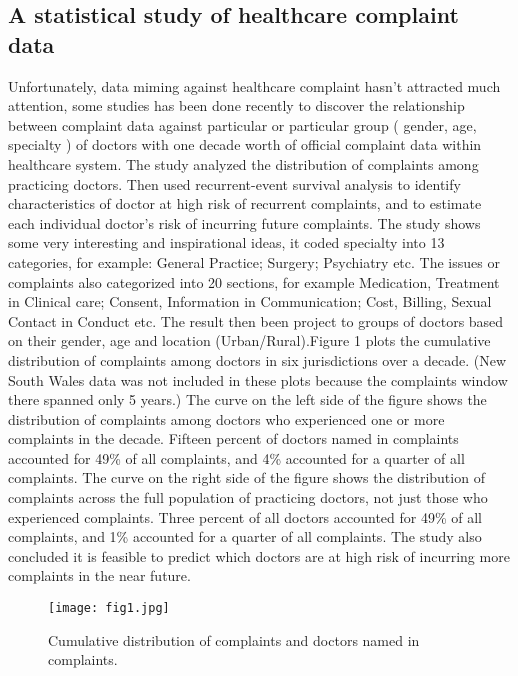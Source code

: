 \documentclass[10pt,twocolumn]{article}
\begin{document}
\subsection{A statistical study of healthcare complaint data}
Unfortunately, data miming against healthcare complaint hasn’t attracted much attention,  some studies has been done recently to discover the relationship between complaint data against particular or particular group ( gender, age, specialty ) of doctors with one decade worth of official complaint data within healthcare system. The study analyzed the distribution of complaints among practicing doctors.\cite{ref5} Then used recurrent-event survival analysis to identify characteristics of doctor at high risk of recurrent complaints, and to estimate each individual doctor’s risk of incurring future complaints. The study shows some very interesting and inspirational ideas, it coded specialty into 13 categories, for example: General Practice; Surgery; Psychiatry etc. The issues or complaints also categorized into 20 sections, for example Medication, Treatment in Clinical care; Consent, Information in Communication; Cost, Billing, Sexual Contact in Conduct etc. The result then been project to groups of doctors based on their gender, age and location (Urban/Rural).Figure 1 plots the cumulative distribution of complaints among doctors in six jurisdictions over a decade. (New South Wales data was not included in these plots because the complaints window there spanned only 5 years.) The curve on the left side of the figure shows the distribution of complaints among doctors who experienced one or more complaints in the decade. Fifteen percent of doctors named in complaints accounted for 49\% of all complaints, and 4\% accounted for a quarter of all complaints. The curve on the right side of the figure shows the distribution of complaints across the full population of practicing doctors, not just those who experienced complaints. Three percent of all doctors accounted for 49\% of all complaints, and 1\% accounted for a quarter of all complaints.
The study also concluded it is feasible to predict which doctors are at high risk of incurring more complaints in the near future.\cite{ref5}
\begin{figure}[!b]
  \begin{center}
    \texttt{[image: fig1.jpg]}
  \end{center}
  \caption{\small Cumulative distribution of complaints and doctors named in complaints.}
  \label{Fig1}
\end{figure} 
\end{document}
